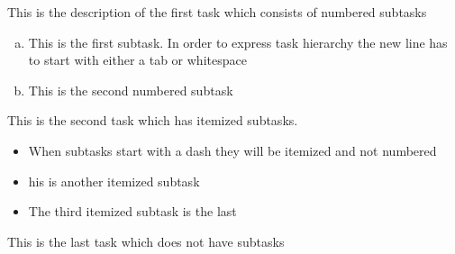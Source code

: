 \documentclass[12pt]{LaTeXercise}
\begin{document}


\begin{aufg}
This is the description of the first task which consists of numbered subtasks

\begin{enumerate}[a)]
	\item This is the first subtask. In order to express task hierarchy the new line has to start with either a tab or whitespace
	\item This is the second numbered subtask
\end{enumerate}

\end{aufg}

\begin{aufg}
This is the second task which has itemized subtasks.

\begin{itemize}
	\item When subtasks start with a dash they will be itemized and not numbered
	\item his is another itemized subtask
	\item The third itemized subtask is the last
\end{itemize}

\end{aufg}

\begin{aufg}
This is the last task which does not have subtasks
\end{aufg}
\end{document}
